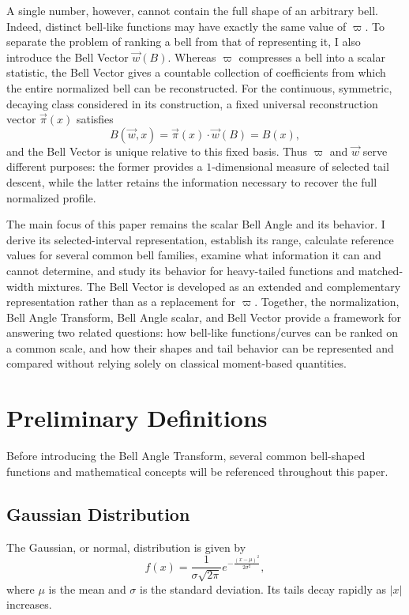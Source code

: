 \documentclass[11pt]{article}
\theoremstyle{definition}
\theoremstyle{plain}
\theoremstyle{remark}
\begin{document}
A single number, however, cannot contain the full shape of an arbitrary bell. Indeed,
distinct bell-like functions may have exactly the same value of $\varpi$. To separate
the problem of ranking a bell from that of representing it, I also introduce
the Bell Vector $\vec{w}(B)$. Whereas $\varpi$ compresses a bell into a scalar statistic,
the Bell Vector gives a countable collection of coefficients from which the entire
normalized bell can be reconstructed. For the continuous, symmetric, decaying class
considered in its construction, a fixed universal reconstruction vector
$\vec{\pi}(x)$ satisfies
\[
B(\vec{w},x)=\vec{\pi}(x)\cdot\vec{w}(B)=B(x),
\]
and the Bell Vector is unique relative to this fixed basis. Thus $\varpi$ and
$\vec{w}$ serve different purposes: the former provides a \(1\)-dimensional measure of
selected tail descent, while the latter retains the information necessary to recover the
full normalized profile.

The main focus of this paper remains the scalar Bell Angle and its behavior. I derive
its selected-interval representation, establish its range, calculate reference values
for several common bell families, examine what information it can and cannot determine,
and study its behavior for heavy-tailed functions and matched-width mixtures. The Bell
Vector is developed as an extended and complementary representation rather than as a replacement for
$\varpi$. Together, the normalization, Bell Angle Transform, Bell Angle scalar, and Bell
Vector provide a framework for answering two related questions: how bell-like functions/curves
can be ranked on a common scale, and how their shapes and tail behavior can be represented
and compared without relying solely on classical moment-based quantities.
 
\section{Preliminary Definitions}
 

Before introducing the Bell Angle Transform, several common bell-shaped functions and
mathematical concepts will be referenced throughout this paper.

\subsection{Gaussian Distribution}
The Gaussian, or normal, distribution is given by
\[
f(x)=\frac{1}{\sigma\sqrt{2\pi}}e^{-\frac{(x-\mu)^2}{2\sigma^2}},
\]
where $\mu$ is the mean and $\sigma$ is the standard deviation. Its tails decay rapidly
as $|x|$ increases.
\end{document}

